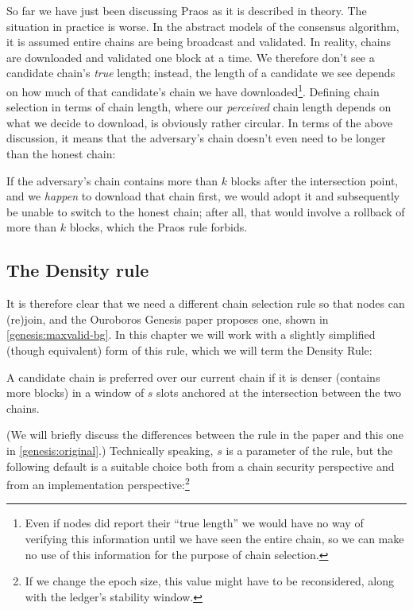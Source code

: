 So far we have just been discussing Praos as it is described in theory. The
situation in practice is worse. In the abstract models of the consensus
algorithm, it is assumed entire chains are being broadcast and validated. In
reality, chains are downloaded and validated one block at a time.
We therefore don't see a candidate chain's \emph{true} length; instead, the
length of a candidate we see depends on how much of that candidate's chain we
have downloaded\footnote{Even if nodes did report their ``true length'' we would
have no way of verifying this information until we have seen the entire chain,
so we can make no use of this information for the purpose of chain selection.}.
Defining chain selection in terms of chain length, where our \emph{perceived}
chain length depends on what we decide to download, is obviously rather
circular. In terms of the above discussion, it means that the adversary's chain
doesn't even need to be longer than the honest chain:
%
\begin{center}
\end{center}
%
If the adversary's chain contains more than $k$ blocks after the intersection
point, and we \emph{happen} to download that chain first, we would adopt it and
subsequently be unable to switch to the honest chain; after all, that would
involve a rollback of more than $k$ blocks, which the Praos rule forbids.

\subsection{The Density rule}
\label{genesis:background:density-rule}

It is therefore clear that we need a different chain selection rule so that
nodes can (re)join, and the Ouroboros Genesis paper \cite{cryptoeprint:2018:378}
proposes one, shown in \cref{genesis:maxvalid-bg}. In this chapter we will work
with a slightly simplified (though equivalent) form of this rule, which we will
term the Density Rule:
%
\begin{definition}
A candidate chain is preferred over our current chain if it is denser
(contains more blocks) in a window of $s$ slots anchored at the intersection
between the two chains.
\end{definition}
%
(We will briefly discuss the differences between the rule in the paper and this
one in \cref{genesis:original}.) Technically speaking, $s$ is a
parameter of the rule, but the following default is a suitable choice both from
a chain security perspective and from an implementation perspective:\footnote{If
we change the epoch size, this value might have to be reconsidered, along with
the ledger's stability window.}

